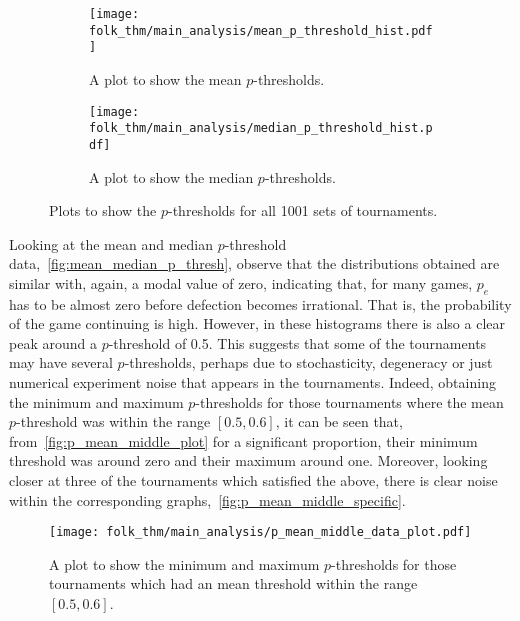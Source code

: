 \begin{figure}
    \begin{subfigure}{0.45\textwidth}
        \centering
        \texttt{[image: folk\_thm/main\_analysis/mean\_p\_threshold\_hist.pdf]}
        \caption{A plot to show the mean \(p\)-thresholds.}\label{subfig:mean_p_thresh}
    \end{subfigure}
    \begin{subfigure}{0.45\textwidth}
        \centering
        \texttt{[image: folk\_thm/main\_analysis/median\_p\_threshold\_hist.pdf]}
        \caption{A plot to show the median \(p\)-thresholds.}\label{subfig:median_p_thresh}
    \end{subfigure}
    \caption{Plots to show the \(p\)-thresholds for all 1001 sets of tournaments.}\label{fig:mean_median_p_thresh}
\end{figure}


Looking at the mean and median \(p\)-threshold data,~\autoref{fig:mean_median_p_thresh}, observe that the distributions obtained
are similar with, again, a modal value of zero, indicating that, for many games,
\(p_{e}\) has to be almost zero before defection becomes irrational. That is,
the probability of the game continuing is high. However, in
these histograms there is also a clear peak around a \(p\)-threshold of 0.5. This
suggests that some of the tournaments may have several \(p\)-thresholds, perhaps due
to stochasticity, degeneracy or just numerical experiment noise that appears in the 
tournaments. Indeed, obtaining the minimum and maximum
\(p\)-thresholds for those tournaments where the mean \(p\)-threshold was within the range
\([0.5, 0.6]\), it can be seen that, from~\autoref{fig:p_mean_middle_plot}
for a significant proportion, their minimum
threshold was around zero and their maximum around one. Moreover, looking closer
at three of the tournaments which satisfied the above, there is clear noise within the corresponding graphs,~\autoref{fig:p_mean_middle_specific}.


\begin{figure}
    \centering
    \texttt{[image: folk\_thm/main\_analysis/p\_mean\_middle\_data\_plot.pdf]}
    \caption{A plot to show the minimum and maximum \(p\)-thresholds for those tournaments which had an mean threshold within the range \([0.5, 0.6]\).}\label{fig:p_mean_middle_plot}
\end{figure}


